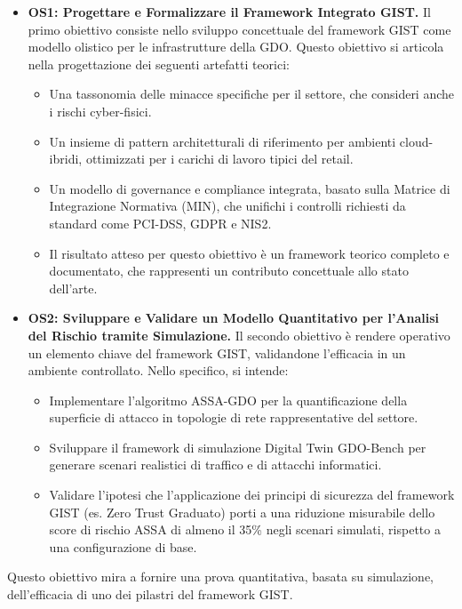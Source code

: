 \begin{itemize}
    \item \textbf{OS1: Progettare e Formalizzare il Framework Integrato GIST.}
    Il primo obiettivo consiste nello sviluppo concettuale del framework GIST come modello olistico per le infrastrutture della GDO. Questo obiettivo si articola nella progettazione dei seguenti artefatti teorici:   
    \begin{itemize}
        \item Una tassonomia delle minacce specifiche per il settore, che consideri anche i rischi cyber-fisici.
        \item Un insieme di pattern architetturali di riferimento per ambienti cloud-ibridi, ottimizzati per i carichi di lavoro tipici del retail.
        \item Un modello di governance e compliance integrata, basato sulla Matrice di Integrazione Normativa (MIN), che unifichi i controlli richiesti da standard come PCI-DSS, GDPR e NIS2.
        \item Il risultato atteso per questo obiettivo è un framework teorico completo e documentato, che rappresenti un contributo concettuale allo stato dell'arte.
        \end{itemize}
    \item \textbf{OS2: Sviluppare e Validare un Modello Quantitativo per l'Analisi del Rischio tramite Simulazione.}
    Il secondo obiettivo è rendere operativo un elemento chiave del framework GIST, validandone l'efficacia in un ambiente controllato. Nello specifico, si intende:

    \begin{itemize}
        \item Implementare l'algoritmo ASSA-GDO per la quantificazione della superficie di attacco in topologie di rete rappresentative del settore.

           \item Sviluppare il framework di simulazione Digital Twin GDO-Bench per generare scenari realistici di traffico e di attacchi informatici.
        
           \item Validare l'ipotesi che l'applicazione dei principi di sicurezza del framework GIST (es. Zero Trust Graduato) porti a una riduzione misurabile dello score di rischio ASSA di almeno il 35\% negli scenari simulati, rispetto a una configurazione di base.
        \end{itemize}
    
\end{itemize}
Questo obiettivo mira a fornire una prova quantitativa, basata su simulazione, dell'efficacia di uno dei pilastri del framework GIST.

